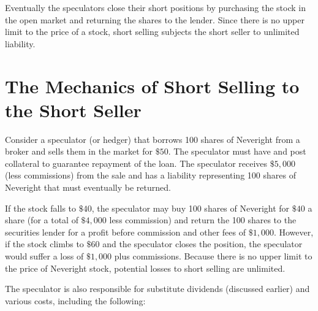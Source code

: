 \documentclass[11pt]{article}
\begin{document}
Eventually the speculators close their short positions by purchasing the stock in the open market and returning the shares to the lender. Since there is no upper limit to the price of a stock, short selling subjects the short seller to unlimited liability.

\section*{The Mechanics of Short Selling to the Short Seller}
Consider a speculator (or hedger) that borrows 100 shares of Neveright from a broker and sells them in the market for $\$ 50$. The speculator must have and post collateral to guarantee repayment of the loan. The speculator receives $\$ 5,000$ (less commissions) from the sale and has a liability representing 100 shares of Neveright that must eventually be returned.

If the stock falls to $\$ 40$, the speculator may buy 100 shares of Neveright for $\$ 40$ a share (for a total of $\$ 4,000$ less commission) and return the 100 shares to the securities lender for a profit before commission and other fees of $\$ 1,000$. However, if the stock climbs to $\$ 60$ and the speculator closes the position, the speculator would suffer a loss of $\$ 1,000$ plus commissions. Because there is no upper limit to the price of Neveright stock, potential losses to short selling are unlimited.

The speculator is also responsible for substitute dividends (discussed earlier) and various costs, including the following:
\end{document}
